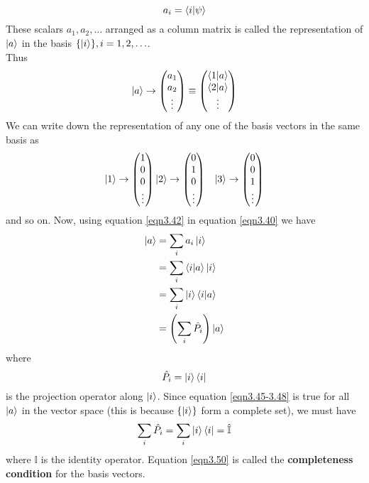 \begin{equation}
\label{eqn3.42}
a_i = \braket{i}{\psi}
\end{equation}
These scalars $a_1, a_2, \ldots$ arranged as a column matrix is called the representation of $\ket{a}$ in the basis $\{\ket{i} \}, i=1,2,\ldots$.\\
Thus
\begin{equation}
\label{eqn3.43}
\ket{a} \rightarrow \left(
\begin{matrix}
a_1 \\ a_2 \\ \vdots
\end{matrix}
\right) \equiv \left(
\begin{matrix}
\braket{1}{a} \\ \braket{2}{a} \\ \vdots
\end{matrix}
\right)
\end{equation}
We can write down the representation of any one of the basis vectors in the same basis as
\begin{eqnarray}
\label{eqn3.44}
\ket{1} \rightarrow \left(
\begin{matrix}
1 \\ 0 \\ 0 \\ \vdots
\end{matrix}
\right)
&
\ket{2} \rightarrow \left(
\begin{matrix}
0 \\ 1 \\ 0 \\ \vdots
\end{matrix}
\right)
&
\ket{3} \rightarrow \left(
\begin{matrix}
0 \\ 0 \\ 1 \\ \vdots
\end{matrix}
\right)
\end{eqnarray}
and so on.
Now, using equation \ref{eqn3.42} in equation \ref{eqn3.40} we have
\begin{align}
\label{eqn3.45-3.48}
	\ket{a} &= \sum_{i} a_i \ket{i} \\
	&= \sum_{i} \braket{i}{a} \ket{i} \\
	&= \sum_{i} \ket{i}\braket{i}{a}\\
	&= \left(\sum_{i} \hat{P_i}\right)\ket{a}
\end{align}
where
\begin{equation}
\label{eqn3.49}
\hat{P_i} = \ket{i}\bra{i}
\end{equation}
is the projection operator along $\ket{i}$. Since equation \ref{eqn3.45-3.48} is true for all $\ket{a}$ in the vector space (this is because $\{\ket{i}\}$ form a complete set), we must have
\begin{equation}\label{eqn3.50}
\sum_{i} \hat{P_i} = \sum_{i}\ket{i} \bra{i} = \hat{\mathbb{I}}
\end{equation}
where $\mathbb{I}$ is the identity operator. Equation \ref{eqn3.50} is called the \textbf{completeness condition} for the basis vectors.


